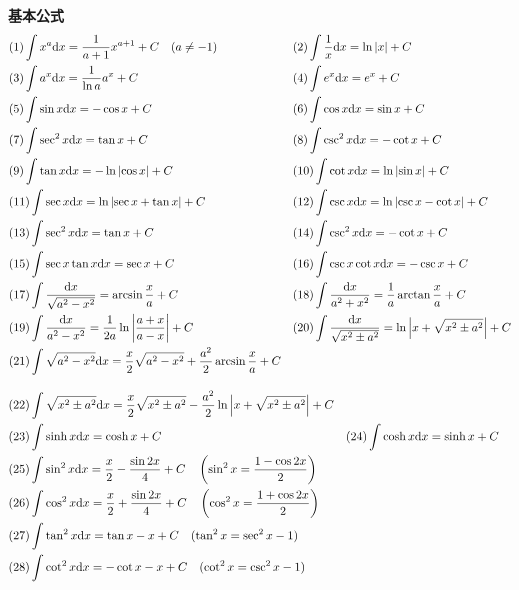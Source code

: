 \vspace{2mm}
\textbf{基本公式}
\begin{alignat}{2}
&(1)\int x^a \mathrm{d} x=\dfrac{1}{a+1}x^{a+1}+C\quad (a\neq-1)   &&(2)\int\dfrac{1}{x}\mathrm{d} x=\ln\left| x \right|+C \nonumber \\
&(3)\int a^x\mathrm{d} x=\dfrac{1}{\ln a} a^x+C  &&(4)\int e^x \mathrm{d} x=e^x+C \nonumber \\
&(5)\int \sin x\mathrm{d} x=-\cos x+C   &&(6)\int \cos x\mathrm{d} x=\sin x+C \nonumber \\
&(7)\int \sec^2 x\mathrm{d} x=\tan x+C  &&(8)\int \csc^2 x\mathrm{d} x=-\cot x+C \nonumber \\
&(9)\int \tan x\mathrm{d} x=-\ln\left|\cos x\right|+C   &&(10)\int \cot x\mathrm{d} x=\ln\left|\sin x\right|+C \nonumber \\
&(11)\int \sec x\mathrm{d} x=\ln\left|\sec x+\tan x\right| +C   &&(12)\int \csc x\mathrm{d} x=\ln\left|\csc x-\cot x\right| +C \nonumber \\
&(13)\int\sec^2 x\mathrm{d} x=\tan x+C  &&(14)\int\csc^2 x\mathrm{d} x=-\cot x+C \nonumber \\
&(15)\int\sec x\tan x\mathrm{d} x=\sec x+C  &&(16)\int\csc x\cot x\mathrm{d} x=-\csc x+C \nonumber \\
&(17)\int \dfrac{\mathrm{d} x}{\sqrt{a^2-x^2}}=\arcsin\dfrac{x}{a}+C    &&(18)\int \dfrac{\mathrm{d} x}{a^2+x^2}=\dfrac{1}{a}\arctan\dfrac{x}{a}+C \nonumber \\
&(19)\int \dfrac{\mathrm{d} x}{a^2-x^2}=\dfrac{1}{2a}\ln\left|\dfrac{a+x}{a-x}\right|+C &&(20)\int \dfrac{\mathrm{d} x}{\sqrt{x^2\pm a^2}}=\ln\left|x+\sqrt{x^2\pm a^2}\right|+C \nonumber \\
&(21)\int\sqrt{a^2-x^2}\mathrm{d} x=\dfrac{x}{2}\sqrt{a^2-x^2}+\dfrac{a^2}{2}\arcsin\dfrac{x}{a}+C \nonumber
\end{alignat}

\begin{alignat}{2}
&(22)\int\sqrt{x^2\pm a^2}\mathrm{d} x=\dfrac{x}{2}\sqrt{x^2\pm a^2}-\dfrac{a^2}{2}\ln\left|x+\sqrt{x^2\pm a^2}\right|+C \nonumber \\
&(23)\int\sinh x\mathrm{d} x=\cosh x+C &&(24)\int\cosh x\mathrm{d} x=\sinh x+C \nonumber \\
&(25)\int\sin^2 x\mathrm{d} x=\dfrac{x}{2}-\dfrac{\sin 2x}{4}+C \quad \left(\sin^2 x=\dfrac{1-\cos 2x}{2}\right) \nonumber \\
&(26)\int\cos^2 x\mathrm{d} x=\dfrac{x}{2}+\dfrac{\sin 2x}{4}+C \quad \left(\cos^2 x=\dfrac{1+\cos 2x}{2}\right) \nonumber \\
&(27)\int\tan^2 x\mathrm{d} x=\tan x-x+C \quad (\tan^2 x = \sec^2 x-1) \nonumber \\
&(28)\int\cot^2 x\mathrm{d} x=-\cot x-x+C \quad (\cot^2 x=\csc^2 x-1) \nonumber
\end{alignat}

